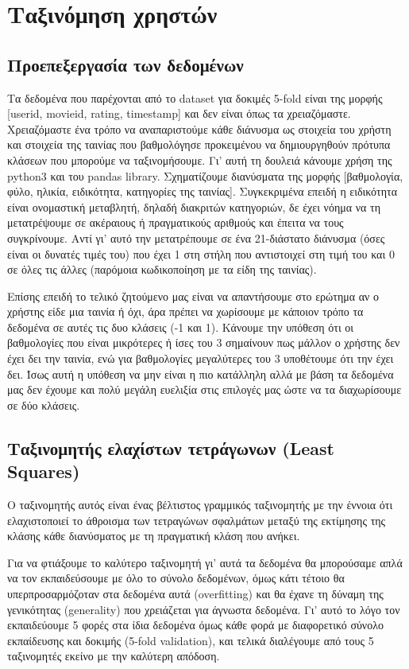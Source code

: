 \section{Ταξινόμηση χρηστών}

\subsection{Προεπεξεργασία των δεδομένων}
Τα δεδομένα που παρέχονται από το dataset για δοκιμές 5-fold είναι της μορφής [userid, movieid, rating, timestamp] και δεν είναι όπως τα χρειαζόμαστε.
Χρειαζόμαστε ένα τρόπο να αναπαριστούμε κάθε διάνυσμα ως στοιχεία του χρήστη και στοιχεία της ταινίας που βαθμολόγησε προκειμένου να δημιουργηθούν πρότυπα κλάσεων που μπορούμε να ταξινομήσουμε.
Γι’ αυτή τη δουλειά κάνουμε χρήση της python3 και του pandas library.
Σχηματίζουμε διανύσματα της μορφής [βαθμολογία, φύλο, ηλικία, ειδικότητα, κατηγορίες της ταινίας].
Συγκεκριμένα επειδή η ειδικότητα είναι ονομαστική μεταβλητή, δηλαδή διακριτών κατηγοριών, δε έχει νόημα να τη μετατρέψουμε σε ακέραιους ή πραγματικούς αριθμούς και έπειτα να τους συγκρίνουμε.
Αντί γι’ αυτό την μετατρέπουμε σε ένα 21-διάστατο διάνυσμα (όσες είναι οι δυνατές τιμές του) που έχει 1 στη στήλη που αντιστοιχεί στη τιμή του και 0 σε όλες τις άλλες (παρόμοια κωδικοποίηση με τα είδη της ταινίας).

Επίσης επειδή το τελικό ζητούμενο μας είναι να απαντήσουμε στο ερώτημα αν ο χρήστης είδε μια ταινία ή όχι, άρα πρέπει να χωρίσουμε με κάποιον τρόπο τα δεδομένα σε αυτές τις δυο κλάσεις (-1 και 1).
Κάνουμε την υπόθεση ότι οι βαθμολογίες που είναι μικρότερες ή ίσες του 3 σημαίνουν πως μάλλον ο χρήστης δεν έχει δει την ταινία, ενώ για βαθμολογίες μεγαλύτερες του 3 υποθέτουμε ότι την έχει δει.
Ίσως αυτή η υπόθεση να μην είναι η πιο κατάλληλη αλλά με βάση τα δεδομένα μας δεν έχουμε και πολύ μεγάλη ευελιξία στις επιλογές μας ώστε να τα διαχωρίσουμε σε δύο κλάσεις.

\subsection{Ταξινομητής ελαχίστων τετράγωνων (Least Squares)}
Ο ταξινομητής αυτός είναι ένας βέλτιστος γραμμικός ταξινομητής με την έννοια ότι ελαχιστοποιεί το άθροισμα των τετραγώνων σφαλμάτων μεταξύ της εκτίμησης της κλάσης κάθε διανύσματος με τη πραγματική κλάση που ανήκει.

Για να φτιάξουμε το καλύτερο ταξινομητή γι’ αυτά τα δεδομένα θα μπορούσαμε απλά να τον εκπαιδεύσουμε με όλο το σύνολο δεδομένων, όμως κάτι τέτοιο θα υπερπροσαρμόζοταν στα δεδομένα αυτά (overfitting) και θα έχανε τη δύναμη της γενικότητας (generality) που χρειάζεται για άγνωστα δεδομένα.
Γι’ αυτό το λόγο τον εκπαιδεύουμε 5 φορές στα ίδια δεδομένα όμως κάθε φορά με διαφορετικό σύνολο εκπαίδευσης και δοκιμής (5-fold validation), και τελικά διαλέγουμε από τους 5 ταξινομητές εκείνο με την καλύτερη απόδοση.

